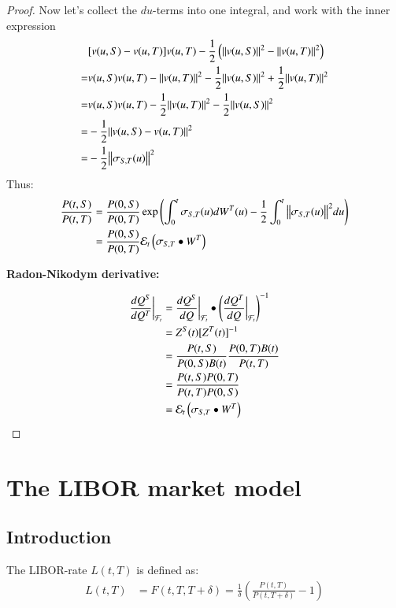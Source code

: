 \begin{proof}
\newpage 

Now let's collect the $du$-terms into one integral, and work with the inner expression 
\begin{align*}
&[v(u,S)-v(u,T)]v(u,T) -\frac{1}{2}\left(\norm{v(u,S)}^{2}-\norm{v(u,T)}^{2}\right) \\
=& 
v(u,S)v(u,T)-\norm{v(u,T)}^{2} -\frac{1}{2}\norm{v(u,S)}^{2} + \frac{1}{2}\norm{v(u,T)}^{2} \\ 
=& 
v(u,S)v(u,T)-\frac{1}{2}\norm{v(u,T)}^{2} - \frac{1}{2}\norm{v(u,S)}^{2} \\ 
=& 
-\frac{1}{2}\norm{v(u,S)-v(u,T)}^{2} \\ 
=& -\frac{1}{2}\norm{\sigma_{S,T}(u)}^{2}
\end{align*}
Thus: 
\begin{align*}
\frac{P(t,S)}{P(t,T)}
&= 
\frac{P(0,S)}{P(0,T)}\exp\left(
\int_{0}^{t}\sigma_{S,T}(u)dW^{T}(u) -\frac{1}{2}\int_{0}^{t}\norm{\sigma_{S,T}(u)}^{2}du 
\right) \\ 
&= 
\frac{P(0,S)}{P(0,T)}\mathcal{E}_{t}\left(
\sigma_{S,T}\bullet W^{T}
\right)
\end{align*}

\textbf{Radon-Nikodym derivative:}

\begin{align*}
\frac{dQ^{S}}{dQ^{T}}\bigg{|}_{\mathcal{F}_{t}} 
&= 
\frac{dQ^{S}}{dQ}\bigg{|}_{\mathcal{F}_{t}}\bullet\left(
\frac{dQ^{T}}{dQ}\bigg{|}_{\mathcal{F}_{t}}
\right)^{-1} \\ 
&= 
Z^{S}(t)[Z^{T}(t)]^{-1} \\ 
&= 
\frac{P(t,S)}{P(0,S)B(t)}\frac{P(0,T)B(t)}{P(t,T)} \\ 
&= 
\frac{
P(t,S)P(0,T)
}{
P(t,T)P(0,S)
} \\ 
&= 
\mathcal{E}_{t}\left(
\sigma_{S,T}\bullet W^{T}
\right)
\end{align*}
\end{proof}

\newpage 
\section{The LIBOR market model}

\subsection{Introduction}

\begin{definition}
The LIBOR-rate  $L(t,T)$ 
is defined as: 
 \begin{align*}
L(t,T) &= F(t,T,T+\delta) 
= \frac{1}{\delta}\left(
\frac{P(t,T)}{P(t,T+\delta)}-1
\right)     
 \end{align*}
\end{definition}

